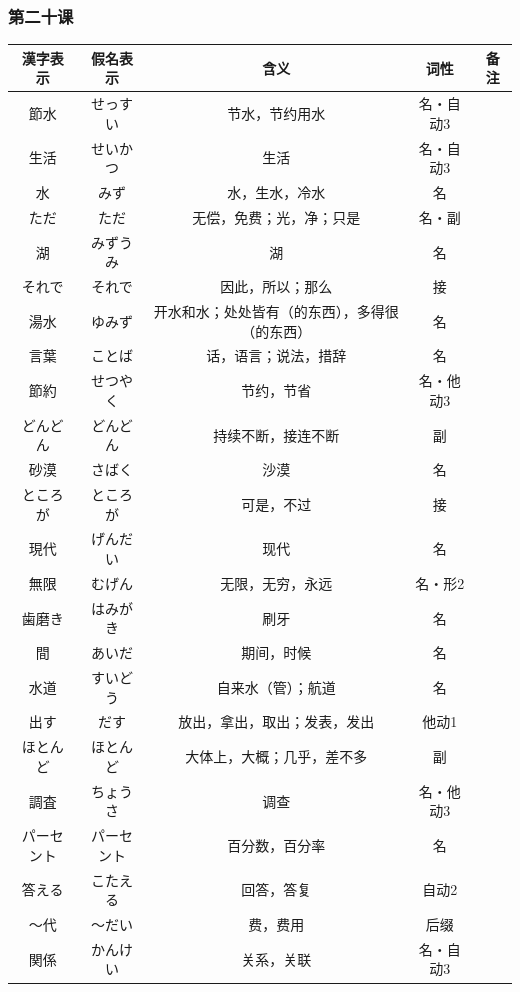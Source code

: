 \subsubsection{第二十课}
\begin{longtable}{|c|c|c|c|c|}
    \hline
    漢字表示 & 假名表示  & 含义 & 词性 & 备注 \\ \hline\hline
    節水 & せっすい & 节水，节约用水 & 名・自动3 & \\ \hline
    生活 & せいかつ & 生活 & 名・自动3 & \\ \hline
    水 & みず & 水，生水，冷水 & 名 & \\ \hline
    ただ & ただ & 无偿，免费；光，净；只是 & 名・副 & \\ \hline
    湖 & みずうみ & 湖 & 名 & \\ \hline
    それで & それで & 因此，所以；那么 & 接 & \\ \hline
    湯水 & ゆみず & 开水和水；处处皆有（的东西），多得很（的东西） & 名 & \\ \hline
    言葉 & ことば & 话，语言；说法，措辞 & 名 & \\ \hline
    節約 & せつやく & 节约，节省 & 名・他动3 & \\ \hline
    どんどん & どんどん & 持续不断，接连不断 & 副 & \\ \hline
    砂漠 & さばく & 沙漠 & 名 & \\ \hline
    ところが & ところが & 可是，不过 & 接 & \\ \hline
    現代 & げんだい & 现代 & 名 & \\ \hline
    無限 & むげん & 无限，无穷，永远 & 名・形2 & \\ \hline
    歯磨き & はみがき & 刷牙 & 名 & \\ \hline
    間 & あいだ & 期间，时候 & 名 & \\ \hline
    水道 & すいどう & 自来水（管）；航道 & 名 & \\ \hline
    出す & だす & 放出，拿出，取出；发表，发出 & 他动1 & \\ \hline
    ほとんど & ほとんど & 大体上，大概；几乎，差不多 & 副 & \\ \hline
    調査 & ちょうさ & 调查 & 名・他动3 & \\ \hline
    パーセント & パーセント & 百分数，百分率 & 名 & \\ \hline
    答える & こたえる & 回答，答复 & 自动2 & \\ \hline
    〜代 & 〜だい & 费，费用 & 后缀 & \\ \hline
    関係 & かんけい & 关系，关联 & 名・自动3 & \\ \hline

\end{longtable}
